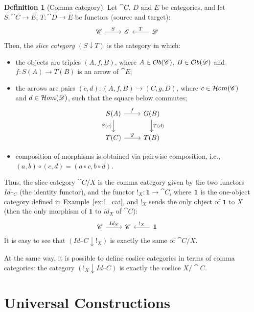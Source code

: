 \documentclass[a4paper, twoside,openright]{report}
\theoremstyle{plain}
\theoremstyle{definition}
\newtheorem{definition}[theorem]{Definition}
\begin{document}
\begin{definition}[Comma category]\label{def:comma_category}
    Let $\cat{C \text{, } D \text{ and } E}$ be categories, and let $S: \cat{C \rightarrow E}$, $T:\cat{D \rightarrow E}$ be functors (source and target):
    \[
        \begin{tikzcd}
            \cat{C} \arrow[r, "S"] & \cat{E} & \cat{D} \arrow[l, "T" swap]
        \end{tikzcd}
    \]
    Then, the \emph{slice category $(S \downarrow T)$} is the category in which: 
    \begin{itemize}
        \item the objects are triples $(A, f, B)$, where $A \in \mathcal{O}b(\mathscr{C})$, $B \in \mathcal{O}b(\mathscr{D})$ and $f: S(A) \rightarrow T(B)$ is an arrow of $\cat E$;
        \item the arrows are pairs $(c, d): (A, f, B) \rightarrow (C, g, D)$, where $c \in \mathcal{H}om(\mathscr{C})$ and $d \in \mathcal{H}om(\mathscr{D})$, such that the square below commutes;
        \[
            \begin{tikzcd}
            S(A) \arrow[r, "f"] \arrow[d, "S(c)" swap] & G(B) \arrow[d, "T(d)"] \\
            T(C) \arrow[r, "g"] & T(B)
            \end{tikzcd}
        \]
        \item composition of morphisms is obtained via pairwise composition, i.e., $(a, b) \circ (c, d) = (a \circ c, b \circ d)$.
    \end{itemize}
\end{definition}

Thus, the slice category $\cat C / X$ is the comma category given by the two functors $Id_{\cat C}$ (the identity functor), and the functor $!_X: \textbf{1} \rightarrow \cat C$, where $\textbf 1$ is the one-object category defined in Example~\ref{ex:1_cat}, and $!_X$ sends the only object of $\textbf{1}$ to $X$ (then the only morphism of $\textbf{1}$ to $id_X$ of $\cat C$):
\[
    \begin{tikzcd}
        \cat C \arrow[r, "{Id_\cat C}"] & \cat C & \textbf{1} \arrow[l, "{!_X}"swap]
    \end{tikzcd}
\]
It is easy to see that $(Id_\cat C \downarrow !_X)$ is exactly the same of $\cat C / X$.

At the same way, it is possible to define coslice categories in terms of comma categories: the category $(!_X \downarrow Id_\cat C)$ is exactly the coslice $X / \cat C$.


\section{Universal Constructions}
\end{document}
